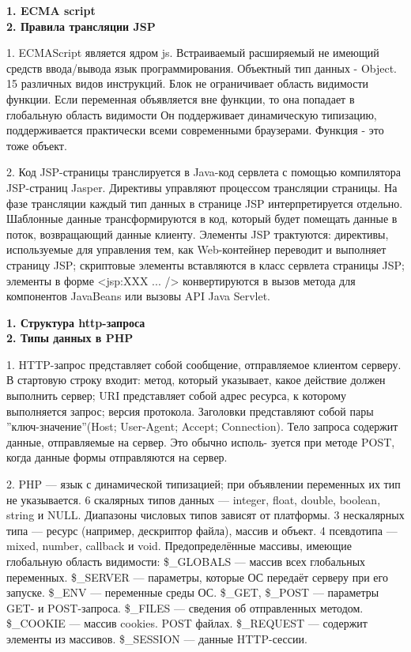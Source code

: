 \documentclass{article}
\begin{document}
\hfill
\begin{minipage}{.3\textwidth}
    \textbf{1. ECMA script}\\
    \textbf{2. Правила трансляции JSP}

1. ECMAScript является ядром js. Встраиваемый расширяемый не имеющий
средств ввода/вывода язык программирования. Объектный тип данных - Object. 15 различных видов инструкций.
Блок не ограничивает область видимости функции. Если переменная объявляется вне функции, то она попадает в глобальную область видимости
Он поддерживает динамическую типизацию, поддерживается практически всеми современными браузерами. Функция - это тоже объект.

2. Код JSP-страницы транслируется в Java-код сервлета с помощью компилятора JSP-страниц Jasper. Директивы управляют процессом трансляции страницы. На фазе трансляции каждый тип данных в странице JSP интерпретируется отдельно. Шаблонные данные трансформируются в код, который будет помещать данные в поток, возвращающий данные клиенту. 
Элементы JSP трактуются: директивы, используемые для управления тем, как Web-контейнер переводит и выполняет страницу JSP;
скриптовые элементы вставляются в класс сервлета страницы JSP;
элементы в форме <jsp:XXX ... /> конвертируются в вызов метода для компонентов JavaBeans или вызовы API Java Servlet.

\end{minipage}
\hfill
\begin{minipage}{.3\textwidth}
    \textbf{1. Структура http-запроса}\\
    \textbf{2. Типы данных в PHP}

1. HTTP-запрос представляет собой сообщение, отправляемое клиентом серверу. В стартовую строку входит: метод, который указывает, какое действие должен выполнить сервер; URI представляет собой адрес ресурса, к которому выполняется запрос; версия протокола.
Заголовки представляют собой пары ”ключ-значение”(Host; User-Agent; Accept; Connection). Тело запроса содержит данные, отправляемые на сервер. Это обычно исполь- зуется при методе POST, когда данные формы отправляются на сервер.

2. PHP — язык с динамической типизацией; при объявлении переменных их тип не указывается.
6 скалярных типов данных — integer, float, double, boolean, string и NULL. Диапазоны числовых типов зависят от платформы.
3 нескалярных типа — ресурс (например, дескриптор файла), массив и объект.
4 псевдотипа — mixed, number, callback и void. Предопределённые массивы, имеющие глобальную область видимости:
\$\_GLOBALS — массив всех глобальных переменных.
\$\_SERVER — параметры, которые ОС передаёт серверу при его запуске.
\$\_ENV — переменные среды ОС.
\$\_GET, \$\_POST — параметры GET- и POST-запроса. 
\$\_FILES — сведения об отправленных методом. 
\$\_COOKIE — массив cookies.
POST файлах.
\$\_REQUEST — содержит элементы из массивов.
\$\_SESSION — данные HTTP-сессии.
\end{minipage}
\end{document}
